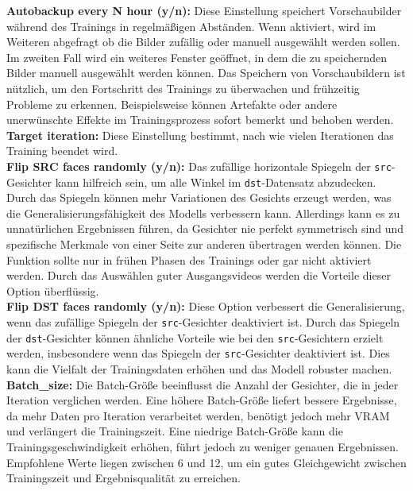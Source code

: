 \textbf{Autobackup every N hour (y/n):} Diese Einstellung speichert Vorschaubilder während des Trainings in regelmäßigen Abständen.
Wenn aktiviert, wird im Weiteren abgefragt ob die Bilder zufällig oder manuell ausgewählt werden sollen.
Im zweiten Fall wird ein weiteres Fenster geöffnet, in dem die zu speichernden Bilder manuell ausgewählt werden können.
Das Speichern von Vorschaubildern ist nützlich, um den Fortschritt des Trainings zu überwachen und frühzeitig Probleme zu erkennen.
Beispielsweise können Artefakte oder andere unerwünschte Effekte im Trainingsprozess sofort bemerkt und behoben werden.\\

\textbf{Target iteration:} Diese Einstellung bestimmt, nach wie vielen Iterationen das Training beendet wird.\\

\textbf{Flip SRC faces randomly (y/n):} Das zufällige horizontale Spiegeln der \texttt{src}-Gesichter kann hilfreich sein, um alle Winkel im \texttt{dst}-Datensatz abzudecken.
Durch das Spiegeln können mehr Variationen des Gesichts erzeugt werden, was die Generalisierungsfähigkeit des Modells verbessern kann.
Allerdings kann es zu unnatürlichen Ergebnissen führen, da Gesichter nie perfekt symmetrisch sind und spezifische Merkmale von einer Seite zur anderen übertragen werden können.
Die Funktion sollte nur in frühen Phasen des Trainings oder gar nicht aktiviert werden.
Durch das Auswählen guter Ausgangsvideos werden die Vorteile dieser Option überflüssig.\\

\textbf{Flip DST faces randomly (y/n):} Diese Option verbessert die Generalisierung, wenn das zufällige Spiegeln der \texttt{src}-Gesichter deaktiviert ist.
Durch das Spiegeln der \texttt{dst}-Gesichter können ähnliche Vorteile wie bei den \texttt{src}-Gesichtern erzielt werden, insbesondere wenn das Spiegeln der \texttt{src}-Gesichter deaktiviert ist.
Dies kann die Vielfalt der Trainingsdaten erhöhen und das Modell robuster machen.\\

\textbf{Batch\_size:} Die Batch-Größe beeinflusst die Anzahl der Gesichter, die in jeder Iteration verglichen werden.
Eine höhere Batch-Größe liefert bessere Ergebnisse, da mehr Daten pro Iteration verarbeitet werden, benötigt jedoch mehr VRAM und verlängert die Trainingszeit.
Eine niedrige Batch-Größe kann die Trainingsgeschwindigkeit erhöhen, führt jedoch zu weniger genauen Ergebnissen.
Empfohlene Werte liegen zwischen 6 und 12, um ein gutes Gleichgewicht zwischen Trainingszeit und Ergebnisqualität zu erreichen.\\

